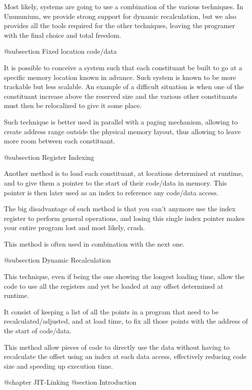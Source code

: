 Most likely, systems are going to use a combination of the various techniques.
In Unununium, we provide strong support for dynamic recalculation, but we also
provides all the tools required for the other techniques, leaving the programer
with the final choice and total freedom.

@subsection Fixed location code/data

 It is possible to conceive a system such that each constituant be built to go
 at a specific memory location known in advance.  Such system is known to be
 more trackable but less scalable.  An example of a difficult situation is when
 one of the constituant increase above the reserved size and the various other
 constituants must then be relocalized to give it some place.
 
 Such technique is better used in parallel with a paging mechanism, allowing to
 create address range outside the physical memory layout, thus allowing to
 leave more room between each constituant.
 
@subsection Register Indexing
 
 Another method is to load each constituant, at locations determined at runtime,
 and to give them a pointer to the start of their code/data in memory.  This
 pointer is then later used as an index to reference any code/data access.
 
 The big disadvantage of such method is that you can't anymore use the index
 register to perform general operations, and losing this single index pointer
 makes your entire program lost and most likely, crash.
 
 This method is often used in combination with the next one.
 
@subsection Dynamic Recalculation
 
 This technique, even if being the one showing the longest loading time, allow
 the code to use all the registers and yet be loaded at any offset determined
 at runtime.
 
 It consist of keeping a list of all the points in a program that need to be
 recalculated/adjusted, and at load time, to fix all those points with the
 address of the start of code/data.
 
 This method allow pieces of code to directly use the data without having to
 recalculate the offset using an index at each data access, effectively
 reducing code size and speeding up execution time.


@chapter JIT-Linking
@section Introduction

